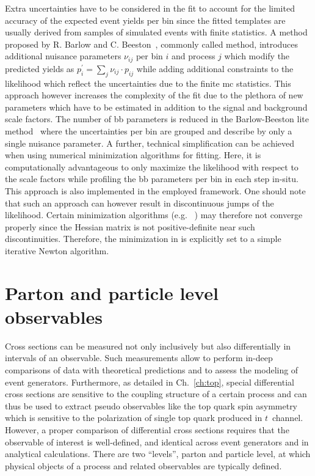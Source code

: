 Extra uncertainties have to be considered in the fit to account for the limited accuracy of the expected event yields per bin since the fitted templates are usually derived from samples of simulated events with finite statistics. A method proposed by R. Barlow and C. Beeston~\cite{Barlow:1993dm}, commonly called  method, introduces additional nuisance parameters $\nu_{ij}$ per bin $i$ and process $j$ which 
modify the predicted yields as $p_{i}^\prime=\sum_{j}\nu_{ij}\cdot p_{ij}$ while adding additional constraints to the likelihood which reflect the uncertainties due to the finite \gls{mc} statistics. This approach however increases the complexity of the fit due to the plethora of new parameters which have to be estimated in addition to the signal and background scale factors. The number of \gls{bb} parameters is reduced in the Barlow-Beeston lite method~\cite{Conway:2011in} where the uncertainties per bin are grouped and describe by only a single nuisance parameter. A further, technical simplification can be achieved when using numerical minimization algorithms for fitting. Here, it is computationally advantageous to only maximize the likelihood with respect to the scale factors while profiling the \gls{bb} parameters per bin in each step in-situ. This approach is also implemented in the employed \THETA framework. One should note that such an approach can however result in discontinuous jumps of the likelihood. Certain minimization algorithms (e.g. \MINUIT[format=hyperbf]~\cite{James:1975dr}) may therefore not converge properly since the Hessian matrix is not positive-definite near such discontinuities. Therefore, the minimization in \THETA is explicitly set to a simple iterative Newton algorithm.



\section{Parton and particle level observables}

Cross sections can be measured not only inclusively but also differentially in intervals of an observable. Such measurements allow to perform in-deep comparisons of data with theoretical predictions and to assess the modeling of event generators. Furthermore, as detailed in Ch.~\ref{ch:top}, special differential cross sections are sensitive to the coupling structure of a certain process and can thus be used to extract pseudo observables like the top quark spin asymmetry which is sensitive to the polarization of single top quark produced in $t$~channel. However, a proper comparison of differential cross sections requires that the observable of interest is well-defined, and identical across event generators and in analytical calculations. There are two ``levels'', parton and particle level, at which physical objects of a process and related observables are typically defined. 

